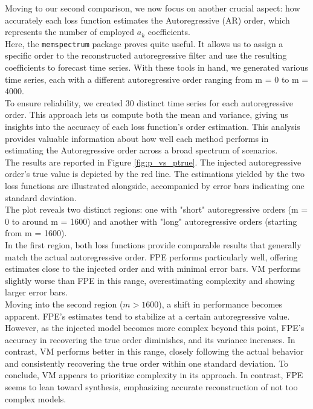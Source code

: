 \documentclass[epj,nopacs]{svjour}
\begin{document}
Moving to our second comparison, we now focus on another crucial aspect: how accurately each loss function estimates the Autoregressive (AR) order, which represents the number of employed $a_k$ coefficients. \\ 
Here, the \texttt{memspectrum} package proves quite useful. It allows us to assign a specific order to the reconstructed autoregressive filter and use the resulting coefficients to forecast time series. With these tools in hand, we generated various time series, each with a different autoregressive order ranging from m = 0 to m = 4000.\\ 
To ensure reliability, we created 30 distinct time series for each autoregressive order. This approach lets us compute both the mean and variance, giving us insights into the accuracy of each loss function's order estimation. This analysis provides valuable information about how well each method performs in estimating the Autoregressive order across a broad spectrum of scenarios. \\ 
The results are reported in Figure \ref{fig:p_vs_ptrue}. The injected autoregressive order's true value is depicted by the red line. The estimations yielded by the two loss functions are illustrated alongside, accompanied by error bars indicating one standard deviation. \\ 
The plot reveals two distinct regions: one with "short" autoregressive orders (m = 0 to around m = 1600) and another with "long" autoregressive orders (starting from m = 1600).\\ 
In the first region, both loss functions provide comparable results that generally match the actual autoregressive order. FPE performs particularly well, offering estimates close to the injected order and with minimal error bars. VM performs slightly worse than FPE in this range, overestimating complexity and showing larger error bars.\\ 
Moving into the second region ($m > 1600$), a shift in performance becomes apparent. FPE's estimates tend to stabilize at a certain autoregressive value. However, as the injected model becomes more complex beyond this point, FPE's accuracy in recovering the true order diminishes, and its variance increases. In contrast, VM performs better in this range, closely following the actual behavior and consistently recovering the true order within one standard deviation.
To conclude, VM appears to prioritize complexity in its approach. In contrast, FPE seems to lean toward synthesis, emphasizing accurate reconstruction of not too complex models. 
\end{document}
